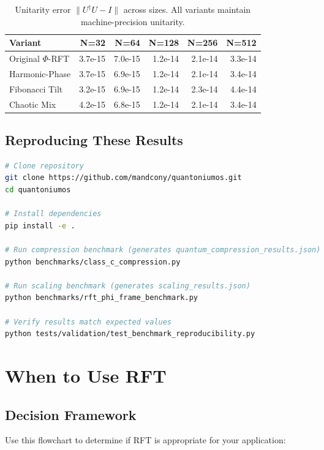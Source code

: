 \documentclass[11pt, a4paper, openany]{book}
\theoremstyle{definition}
\begin{document}
\begin{table}[h]
\centering
\small
\begin{tabular}{@{}lrrrrr@{}}\toprule
Variant & N=32 & N=64 & N=128 & N=256 & N=512 \\ \midrule
Original $\Phi$-RFT & 3.7e-15 & 7.0e-15 & 1.2e-14 & 2.1e-14 & 3.3e-14 \\
Harmonic-Phase & 3.7e-15 & 6.9e-15 & 1.2e-14 & 2.1e-14 & 3.4e-14 \\
Fibonacci Tilt & 3.2e-15 & 6.9e-15 & 1.2e-14 & 2.3e-14 & 4.4e-14 \\
Chaotic Mix & 4.2e-15 & 6.8e-15 & 1.2e-14 & 2.1e-14 & 3.4e-14 \\ \bottomrule
\end{tabular}
\caption{Unitarity error $\|U^\dagger U - I\|$ across sizes. All variants maintain machine-precision unitarity.}
\end{table}

\section{Reproducing These Results}
\begin{lstlisting}[language=bash, caption={Benchmark Reproduction Commands}]
# Clone repository
git clone https://github.com/mandcony/quantoniumos.git
cd quantoniumos

# Install dependencies
pip install -e .

# Run compression benchmark (generates quantum_compression_results.json)
python benchmarks/class_c_compression.py

# Run scaling benchmark (generates scaling_results.json)
python benchmarks/rft_phi_frame_benchmark.py

# Verify results match expected values
python tests/validation/test_benchmark_reproducibility.py
\end{lstlisting}

\chapter{When to Use RFT}

\section{Decision Framework}
Use this flowchart to determine if RFT is appropriate for your application:
\end{document}
